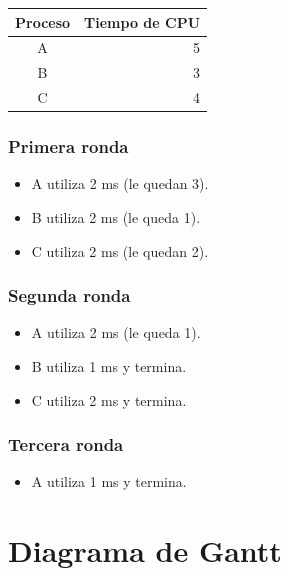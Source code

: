 \documentclass[
  spanish,
  letterpaper,
]{scrbook}
\newcounter{none} %
\providecommand{\tightlist}{%
  \setlength{\itemsep}{0pt}\setlength{\parskip}{0pt}}
\begin{document}
{\def\LTcaptype{none} %
\begin{longtable}[]{@{}cr@{}}
\toprule\noalign{}
Proceso & Tiempo de CPU \\
\midrule\noalign{}
\endhead
\bottomrule\noalign{}
\endlastfoot
A & 5 \\
B & 3 \\
C & 4 \\
\end{longtable}
}

\subsection{Primera ronda}\label{primera-ronda}

\begin{itemize}
\tightlist
\item
  A utiliza 2 ms (le quedan 3).
\item
  B utiliza 2 ms (le queda 1).
\item
  C utiliza 2 ms (le quedan 2).
\end{itemize}

\subsection{Segunda ronda}\label{segunda-ronda}

\begin{itemize}
\tightlist
\item
  A utiliza 2 ms (le queda 1).
\item
  B utiliza 1 ms y termina.
\item
  C utiliza 2 ms y termina.
\end{itemize}

\subsection{Tercera ronda}\label{tercera-ronda}

\begin{itemize}
\tightlist
\item
  A utiliza 1 ms y termina.
\end{itemize}


\chapter{Diagrama de Gantt}\label{diagrama-de-gantt-2}
\end{document}

